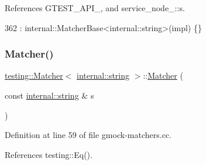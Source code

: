 References G\+T\+E\+S\+T\+\_\+\+A\+P\+I\+\_\+, and service\+\_\+node\+\_\+::s.


\begin{DoxyCode}
362       : internal::MatcherBase<internal::string>(impl) \{\}
\end{DoxyCode}
\mbox{\label{classtesting_1_1Matcher_3_01internal_1_1string_01_4_ae2d21038e4dcc25776187d8bff1665f3}} 
\subsubsection{\texorpdfstring{Matcher()}{Matcher()}\hspace{0.1cm}{\footnotesize\ttfamily [3/4]}}
{\footnotesize\ttfamily \hyperlink{classtesting_1_1Matcher}{testing\+::\+Matcher}$<$ \hyperlink{namespacetesting_1_1internal_a8e8ff5b11e64078831112677156cb111}{internal\+::string} $>$\+::\hyperlink{classtesting_1_1Matcher}{Matcher} (\begin{DoxyParamCaption}\item[{const \hyperlink{namespacetesting_1_1internal_a8e8ff5b11e64078831112677156cb111}{internal\+::string} \&}]{s }\end{DoxyParamCaption})}



Definition at line 59 of file gmock-\/matchers.\+cc.



References testing\+::\+Eq().



